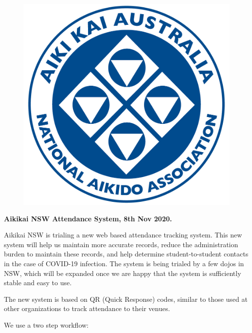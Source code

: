 
\begin{minipage}[t]{\dimexpr0.5\linewidth-1em}

\begin{figure}[H]
\centering\includegraphics[width=0.4\linewidth]{figure/logo-aka.jpg}
\end{figure}

\textbf{Aikikai NSW Attendance System, 8th Nov 2020.}

Aikikai NSW is trialing a new web based attendance tracking system.
This new system will help us maintain more accurate records,
reduce the administration burden to maintain these records,
and help determine student-to-student contacts in the case of COVID-19 infection.
The system is being trialed by a few dojos in NSW, which will be expanded
once we are happy that the system is sufficiently stable and easy to use.

\smallskip
The new system is based on QR (Quick Response) codes, similar to those used
at other organizations to track attendance to their venues.

\smallskip
We use a two step workflow:


\end{minipage}
